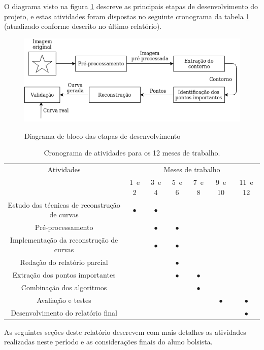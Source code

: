 O diagrama visto na figura \ref{fig:diagrama} descreve as principais etapas de desenvolvimento do projeto, e estas atividades foram dispostas no seguinte cronograma da tabela \ref{tab:cronograma} (atualizado conforme descrito no último relatório).

\begin{figure}[htb]
	\centering
	\caption{Diagrama de bloco das etapas de desenvolvimento}
	\includegraphics[width=.7\linewidth]{./img/diagrama.png}
	\label{fig:diagrama}
\end{figure}

\begin{table}[htb]
	\footnotesize
	\centering
	\vspace{0.5em}
	\setlength{\tabcolsep}{0.05in}
	\begin{tabular}{|c|c|c|c|c|c|c|}
		\hline
		Atividades
		& \multicolumn{6}{c|}{Meses de trabalho} \\
		\cline{2-7}
		& 1\textordmasculine\ e 2\textordmasculine & 3\textordmasculine\  e 4\textordmasculine & 5\textordmasculine\  e 6\textordmasculine & 7\textordmasculine\  e 8\textordmasculine & 9\textordmasculine\  e 10\textordmasculine & 11\textordmasculine\  e 12\textordmasculine \\ \hline
		
		Estudo das técnicas de reconstrução de curvas  & $\bullet$ & $\bullet$ & & & &\\ \hline
		
		Pré-processamento & & $\bullet$ & $\bullet$ & & & \\ \hline
		
		Implementação da reconstrução de curvas & & $\bullet$ & $\bullet$ & & & \\ \hline
		
		Redação do relatório parcial & & & $\bullet$ & & & \\ \hline
		
		Extração dos pontos importantes & & & $\bullet$ & $\bullet$ & & \\ \hline
		
		Combinação dos algoritmos & & & & $\bullet$ & & \\ \hline
		
		Avaliação e testes & & & & & $\bullet$ & $\bullet$ \\ \hline
		
		Desenvolvimento do relatório final & & & & & & $\bullet$ \\ \hline
		
	\end{tabular}
	\caption{Cronograma de atividades para os 12 meses de trabalho.}
	\label{tab:cronograma}
\end{table}

As seguintes seções deste relatório descrevem com mais detalhes as atividades realizadas neste período e as considerações finais do aluno bolsista.
